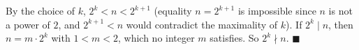 By the choice of $k$, $2^k<n<2^{k+1}$ (equality $n=2^{k+1}$ is impossible since $n$ is not a power of $2$, and $2^{k+1}<n$ would contradict the maximality of $k$). If $2^k\mid n$, then $n=m\cdot2^k$ with $1<m<2$, which no integer $m$ satisfies. So $2^k\nmid n$. $\blacksquare$
